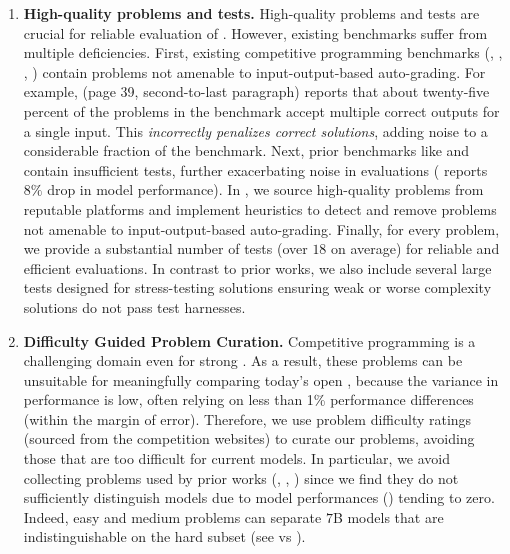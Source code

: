 \begin{enumerate}
    \item \textbf{High-quality problems and tests.}
    High-quality problems and tests are crucial for reliable evaluation of \llms{}.
    However, existing benchmarks suffer from multiple deficiencies.
    First, existing competitive programming benchmarks (\apps{}, \contests{}, \xcode{}, \codescope{}) contain problems not amenable to input-output-based auto-grading.
    For example, \contests{} \citep{li2022competition} (page 39, second-to-last paragraph) reports that about twenty-five percent of the problems in the benchmark accept multiple correct outputs for a single input. 
    This \emph{incorrectly penalizes correct solutions}, adding noise to a considerable fraction of the benchmark.
    Next, prior benchmarks like \humaneval{} and \apps{} contain insufficient tests, further exacerbating noise in evaluations ( \citet{liu2023evaluating} reports $8\%$ drop in model performance).
    In \livecodebench{}, we source high-quality problems from reputable platforms and implement heuristics to detect and remove problems not amenable to input-output-based auto-grading.
    Finally, for every problem, we provide a substantial number of tests (over $18$ on average) for reliable and efficient evaluations. In contrast to prior works, we also include several large tests designed for stress-testing solutions ensuring weak or worse complexity solutions do not pass test harnesses.
        
    \item \textbf{Difficulty Guided Problem Curation.} 
    Competitive programming is a challenging domain even for strong \llms{}.
    As a result, these problems can be unsuitable for meaningfully comparing today's open \llms{}, because the variance in performance is low, often relying on less than 1\% performance differences (within the margin of error).
    Therefore, we use problem difficulty ratings (sourced from the competition websites) to curate our problems, avoiding those that are too difficult for current models.
    In particular, we avoid collecting \codeforces{} problems used by prior works (\contests{}, \codescope{}, \xcode{}) since we find they do not sufficiently distinguish models due to model performances () tending to zero.    
    Indeed, \lcb{} easy and medium problems can separate $7$B models that are indistinguishable on the hard subset (see  vs ).
    
\end{enumerate} 



